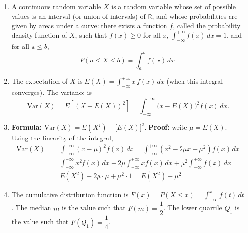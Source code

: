 \documentclass[11pt]{article}
\newcommand{\cle}[1]{{\popxbold\color{popdark}#1}}
\begin{document}
\begin{corrige}
\begin{enumerate}
\item A \cle{continuous random variable} $X$ is a random variable whose set of possible values is an interval (or union of intervals) of $\mathbb{R}$, and whose probabilities are given by areas under a curve: there exists a function $f$, called the \cle{probability density function} of $X$, such that $f(x)\geq 0$ for all $x$, $\displaystyle\int_{-\infty}^{+\infty} f(x)\,dx=1$, and for all $a\leq b$,
\[P(a\leq X\leq b)=\int_a^b f(x)\,dx.\]

\item The \cle{expectation} of $X$ is $E(X)=\displaystyle\int_{-\infty}^{+\infty} x\,f(x)\,dx$ (when this integral converges). The \cle{variance} is
\[\mathrm{Var}(X)=E\!\left[(X-E(X))^2\right]=\int_{-\infty}^{+\infty}\bigl(x-E(X)\bigr)^2 f(x)\,dx.\]

\item \textbf{Formula:} $\mathrm{Var}(X)=E(X^2)-\bigl[E(X)\bigr]^2$. \textbf{Proof:} write $\mu=E(X)$. Using the linearity of the integral,
\begin{align*}
\mathrm{Var}(X)&=\int_{-\infty}^{+\infty}(x-\mu)^2 f(x)\,dx=\int_{-\infty}^{+\infty}\left(x^2-2\mu x+\mu^2\right)f(x)\,dx\\
&=\int_{-\infty}^{+\infty}x^2f(x)\,dx-2\mu\int_{-\infty}^{+\infty}x f(x)\,dx+\mu^2\int_{-\infty}^{+\infty}f(x)\,dx\\
&=E(X^2)-2\mu\cdot\mu+\mu^2\cdot 1=E(X^2)-\mu^2.
\end{align*}

\item The \cle{cumulative distribution function} is $F(x)=P(X\leq x)=\displaystyle\int_{-\infty}^{x} f(t)\,dt$. The \cle{median} $m$ is the value such that $F(m)=\dfrac{1}{2}$. The \cle{lower quartile} $Q_1$ is the value such that $F(Q_1)=\dfrac{1}{4}$.
\end{enumerate}
\end{corrige}
\end{document}
